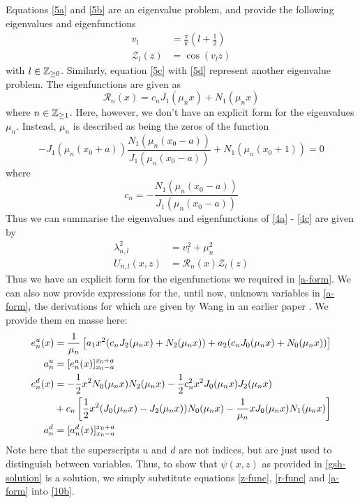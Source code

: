 Equations \ref{5a} and \ref{5b} are an eigenvalue problem, and provide the following eigenvalues and eigenfunctions
\begin{align}
    v_l &= \frac{\pi}{k} \left (l + \frac{1}{2} \right ) \\
    \label{z-func} \mathcal{Z}_l(z) &= \cos(v_l z)
\end{align}
with $l \in \mathbb{Z}_{\ge 0}$. Similarly, equation \ref{5c} with \ref{5d} represent another eigenvalue problem. The eigenfunctions 
are given as
\begin{equation}
    \label{r-func} \mathcal{R}_n(x) = c_n J_1(\mu_n x) + N_1(\mu_n x)
\end{equation}
where $n \in \mathbb{Z}_{\ge 1}$. Here, however, we don't have an explicit form for the eigenvalues $\mu_n$. Instead, 
$\mu_n$ is described as being the zeros of the function
\begin{equation}
    -J_1(\mu_n (x_0 + a)) \frac{N_1(\mu_n (x_0 - a))}{J_1 (\mu_n (x_0 - a))} + N_1(\mu_n (x_0 + 1)) = 0
\end{equation}
where
$$c_n = -\frac{N_1(\mu_n (x_0 - a))}{J_1 (\mu_n (x_0 - a))}$$
Thus we can summarise the eigenvalues and eigenfunctions of \ref{4a} - \ref{4c} are given by
\begin{align}
    \lambda_{n,l}^2 &= v_l^2 + \mu_n^2 \\
    U_{n,l}(x,z) &= \mathcal{R}_n(x) \mathcal{Z}_l(z)
\end{align}
Thus we have an explicit form for the eigenfunctions we required in \ref{a-form}. We can also now 
provide expressions for the, until now, unknown variables in \ref{a-form}, the derivations for which are 
given by Wang in an earlier paper \cite{wang-precursor}. We provide them en masse here:
\begin{align}
    e_n^u(x) &= \frac{1}{\mu_n} \left [ a_1 x^2 (c_n J_2(\mu_n x) + N_2(\mu_n x)) + a_2 (c_n J_0 (\mu_n x) + N_0(\mu_n x)) \right ] \\
    a_n^u &= [e_n^u(x)]_{x_0 - a}^{x_0 + a} \\
    e_n^d(x) &= -\frac{1}{2} x^2 N_0(\mu_n x) N_2(\mu_n x) - \frac{1}{2} c_n^2 x^2 J_0(\mu_n x) J_2(\mu_n x) \\
    \notag &+ c_n \left [ \frac{1}{2}x^2 (J_0(\mu_n x) - J_2(\mu_n x) )N_0(\mu_n x) - \frac{1}{\mu_n} x J_0(\mu_n x) N_1(\mu_n x) \right ] \\
    a_n^d &= [a_n^d (x)]_{x_0-a}^{x_0+a}
\end{align}
Note here that the superscripts $u$ and $d$ are not indices, but are just used to distinguish between variables. Thus, to show that $\psi(x,z)$ as
provided in \ref{gsh-solution} is a solution, we simply substitute equations \ref{z-func}, \ref{r-func} and \ref{a-form} into \ref{10b}.

